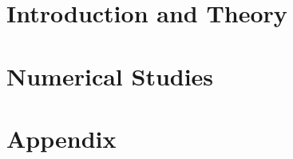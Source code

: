 \documentclass[11pt]{report}
\begin{document}
  \part{Introduction and Theory}
  
  
  
  \part{Numerical Studies}
  
  
  
  

  \part{Appendix}
  \appendix

  
\end{document}
